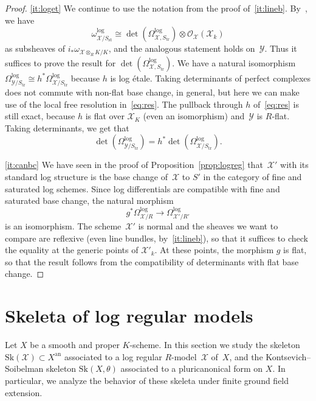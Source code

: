 \documentclass[11pt]{article}
\let\mathcal\mathscr
\theoremstyle{definition}
\numberwithin{equation}{subsection}
\newcommand{\cX}{\ensuremath{\mathscr{X}}}
\newcommand{\cY}{\ensuremath{\mathscr{Y}}}
\newcommand{\an}{\mathrm{an}}
\newcommand{\Sk}{\mathrm{Sk}}
\newcommand{\st}{\mathrm{st}}
\newcommand{\tr}{\mathrm{tr}}
\let\form\theta
\begin{document}
\begin{proof}
\eqref{it:loget} We continue to use the notation from the proof of~\eqref{it:lineb}. By~\cite[5.3.4]{kato-saito}, we have
\[
\omega^{\log}_{\cX/S_{\st}}\cong \det(\Omega^{\log}_{\cX,S_{\tr}})\otimes \mathcal{O}_{\cX}(\cX_k)
\]
as subsheaves of
$i_\ast \omega_{\cX\otimes_R K/K}$, and the analogous statement holds on~$\cY$. Thus it suffices to prove the result for $\det(\Omega^{\log}_{\cX,S_{\tr}})$.
We have a natural isomorphism $\Omega^{\log}_{\cY/S_{\tr}}\cong h^{\ast}\Omega^{\log}_{\cX/S_{\tr}}$ because $h$ is log étale.
Taking determinants of perfect complexes does not commute with non-flat base change, in general, but here we can make use of the local free resolution in~\eqref{eq:res}.
The pullback through $h$ of~\eqref{eq:res} is still exact, because $h$ is flat over $\cX_K$ (even an isomorphism) and~$\cY$ is $R$\nobreakdash-flat.
Taking determinants, we get that
\[
\det(\Omega^{\log}_{\cY/S_{\tr}})=h^{\ast}\det(\Omega^{\log}_{\cX/S_{\tr}}).
\]

\eqref{it:canbc} We have seen in the proof of Proposition~\ref{prop:logreg} that~$\cX'$ with its standard log structure is the
base change of~$\cX$ to $S'$ in the category of fine and saturated log schemes. Since log differentials are compatible with fine and saturated base change, the natural morphism
\[
g^{\ast} \Omega^{\log}_{\cX/R}\to \Omega^{\log}_{\cX'/R'}
\]
is an isomorphism.
The scheme~$\cX'$ is normal and the sheaves we want to compare are reflexive (even line bundles, by~\eqref{it:lineb}), so that it suffices to check the equality at the generic points of $\cX'_k$. At these points, the morphism $g$ is flat, so that the result follows from the compatibility of determinants with flat base change.
\end{proof}

\section{Skeleta of log regular models}\label{sec:skeleta}
Let $X$ be a smooth and proper $K$\nobreakdash-scheme. In this section we study the skeleton $\Sk(\cX)\subset X^{\an}$ associated to a log regular $R$\nobreakdash-model~$\cX$ of~$X$,
and the Kontsevich--Soibelman skeleton $\Sk(X,\form)$ associated to a pluricanonical form on $X$. In particular, we analyze the behavior of these skeleta under finite ground field extension.
\end{document}
